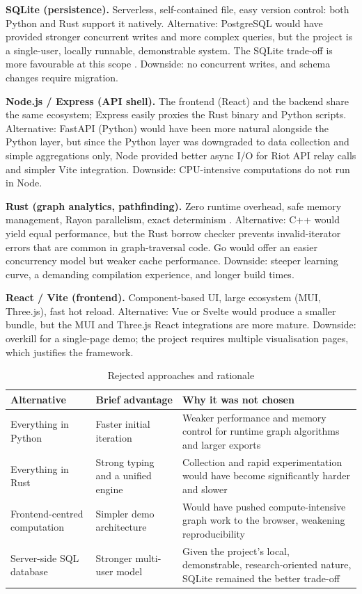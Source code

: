 \textbf{SQLite (persistence).} Serverless, self-contained file, easy version control: both Python and Rust support it natively. Alternative: PostgreSQL would have provided stronger concurrent writes and more complex queries, but the project is a single-user, locally runnable, demonstrable system. The SQLite trade-off is more favourable at this scope \cite{sqlite}. Downside: no concurrent writes, and schema changes require migration.

\textbf{Node.js / Express (API shell).} The frontend (React) and the backend share the same ecosystem; Express easily proxies the Rust binary and Python scripts. Alternative: FastAPI (Python) would have been more natural alongside the Python layer, but since the Python layer was downgraded to data collection and simple aggregations only, Node provided better async I/O for Riot API relay calls and simpler Vite integration. Downside: CPU-intensive computations do not run in Node.

\textbf{Rust (graph analytics, pathfinding).} Zero runtime overhead, safe memory management, Rayon parallelism, exact determinism \cite{jung2020,rustlang}. Alternative: C++ would yield equal performance, but the Rust borrow checker prevents invalid-iterator errors that are common in graph-traversal code. Go would offer an easier concurrency model but weaker cache performance. Downside: steeper learning curve, a demanding compilation experience, and longer build times.

\textbf{React / Vite (frontend).} Component-based UI, large ecosystem (MUI, Three.js), fast hot reload. Alternative: Vue or Svelte would produce a smaller bundle, but the MUI and Three.js React integrations are more mature. Downside: overkill for a single-page demo; the project requires multiple visualisation pages, which justifies the framework.

\begin{table}[H]
\centering
\caption{Rejected approaches and rationale}
\label{tab:rejected-approaches}
\begin{tabularx}{\textwidth}{|>{\raggedright\arraybackslash}p{3.5cm}|>{\raggedright\arraybackslash}p{3.6cm}|X|}
\hline
\textbf{Alternative} & \textbf{Brief advantage} & \textbf{Why it was not chosen} \\
\hline
Everything in Python & Faster initial iteration & Weaker performance and memory control for runtime graph algorithms and larger exports \\
Everything in Rust & Strong typing and a unified engine & Collection and rapid experimentation would have become significantly harder and slower \\
Frontend-centred computation & Simpler demo architecture & Would have pushed compute-intensive graph work to the browser, weakening reproducibility \\
Server-side SQL database & Stronger multi-user model & Given the project's local, demonstrable, research-oriented nature, SQLite remained the better trade-off \\
\hline
\end{tabularx}
\end{table}

